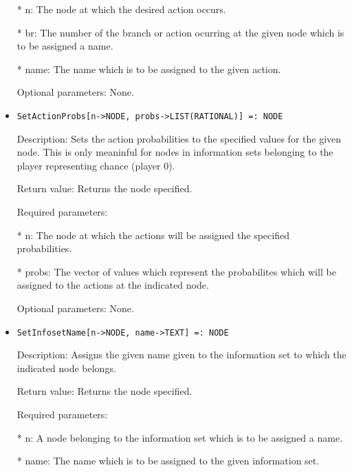 \begin{itemize}
\bd
\item
[* n:] The node at which the desired action occurs.
\item
[* br:] The number of the branch or action ocurring at the given node
which is to be assigned a name.
\item
[* name:] The name which is to be assigned to the given action.
\ed

\item
[Optional parameters:] None.

\ed

\item

\begin{verbatim}
SetActionProbs[n->NODE, probs->LIST(RATIONAL)] =: NODE
\end{verbatim}

\bd
\item
[Description:] Sets the action probabilities to the specified values 
for the given node.  This is only meaninful for nodes in information
sets belonging to the player representing chance (player 0).
\item
[Return value:] Returns the node specified.
\item
[Required parameters:]\hfil\null
	
\bd
\item
[* n:] The node at which the actions will be assigned the specified
probabilities.
\item
[* probs:] The vector of values which represent the probabilites 
which will be assigned to the actions at the indicated node.
\ed

\item
[Optional parameters:] None.
\ed

\item

\begin{verbatim}
SetInfosetName[n->NODE, name->TEXT] =: NODE
\end{verbatim}

\bd
\item
[Description:] Assigns the given name given to the information set to 
which the indicated node belongs.
\item
[Return value:] Returns the node specified.
\item
[Required parameters:]\hfil\null
	
\bd
\item
[* n:] A node belonging to the information set which is to be 
assigned a name.
\item
[* name:] The name which is to be assigned to the given information set.
\ed


\end{itemize}
